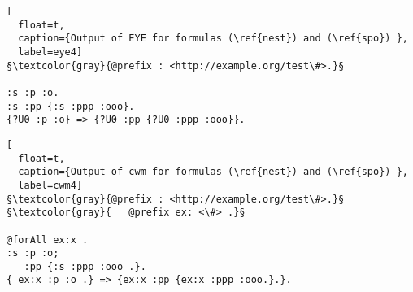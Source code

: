\begin{lstlisting}[
  float=t,
  caption={Output of EYE for formulas (\ref{nest}) and (\ref{spo}) },
  label=eye4]  
§\textcolor{gray}{@prefix : <http://example.org/test\#>.}§

:s :p :o.
:s :pp {:s :ppp :ooo}.
{?U0 :p :o} => {?U0 :pp {?U0 :ppp :ooo}}.

\end{lstlisting}

\begin{lstlisting}[
  float=t,
  caption={Output of cwm for formulas (\ref{nest}) and (\ref{spo}) },
  label=cwm4]  
§\textcolor{gray}{@prefix : <http://example.org/test\#>.}§
§\textcolor{gray}{   @prefix ex: <\#> .}§

@forAll ex:x .   
:s :p :o;
   :pp {:s :ppp :ooo .}.
{ ex:x :p :o .} => {ex:x :pp {ex:x :ppp :ooo.}.}.
\end{lstlisting}



